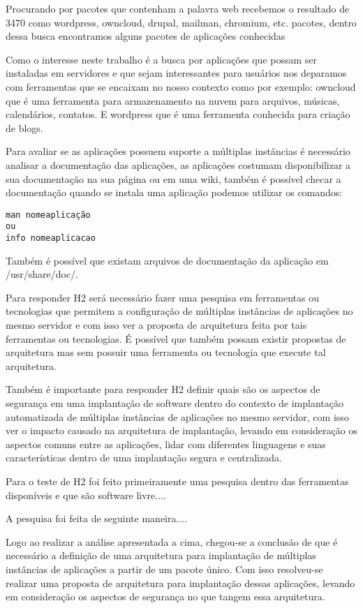 Procurando por pacotes que contenham a palavra web recebemos o resultado de 3470
como wordpress, owncloud, drupal, mailman, chromium, etc.
pacotes, dentro dessa busca encontramos alguns pacotes de aplicações conhecidas

Como o interesse neste trabalho é a busca por aplicações que possam ser instaladas
em servidores e que sejam interessantes para usuários nos deparamos com ferramentas
que se encaixam no nosso contexto como por exemplo: owncloud que é uma ferramenta para armazenamento
na nuvem para arquivos, músicas, calendários, contatos. E wordpress que é
uma ferramenta conhecida para criação de blogs.

Para avaliar se as aplicações possuem suporte a múltiplas instâncias é necessário
analisar a documentação das aplicações, as aplicações costumam disponibilizar a sua
documentação na sua página ou em uma wiki, também é possível checar a documentação
quando se instala uma aplicação podemos utilizar os comandos:

\begin{verbatim}
man nomeaplicação
ou
info nomeaplicacao
\end{verbatim}

Também é possível que existam arquivos de documentação da aplicação em /usr/share/doc/.


Para responder H2 será necessário fazer uma pesquisa em ferramentas ou tecnologias que
permitem a configuração de múltiplas instâncias de aplicações no mesmo servidor e com
isso ver a proposta de arquitetura feita por tais ferramentas ou tecnologias. É
possível que também possam existir propostas de arquitetura mas sem possuir uma
ferramenta ou tecnologia que execute tal arquitetura.

Também é importante para responder H2 definir quais são os aspectos de segurança em
uma implantação de software dentro do contexto de implantação automatizada de
múltiplas instâncias de aplicações no mesmo servidor,
com isso ver o impacto causado na arquitetura de implantação, levando em consideração os
aspectos comuns entre as aplicações, lidar com diferentes linguagens e suas características
dentro de uma implantação segura e centralizada.

Para o teste de H2 foi feito primeiramente uma pesquisa dentro das ferramentas
disponíveis e que são software livre....

A pesquisa foi feita de seguinte maneira....

Logo ao realizar a análise apresentada a cima, chegou-se a conclusão de que
é necessário a definição de uma arquitetura para implantação de múltiplas
instâncias de aplicações a partir de um pacote único. Com isso resolveu-se
realizar uma proposta de arquitetura para implantação dessas aplicações, levando
em consideração os aspectos de segurança no que tangem essa arquitetura.


